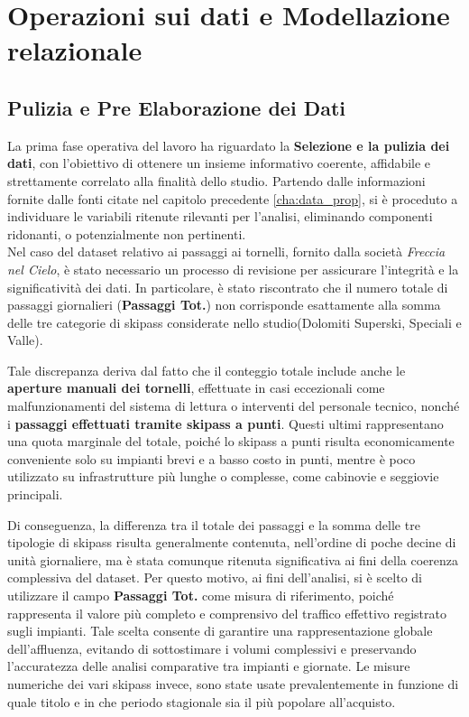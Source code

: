 \chapter{Operazioni sui dati e Modellazione relazionale}
\label{cha:Data_op}

\section{Pulizia e Pre Elaborazione dei Dati} \label{par:Pulizia_dati}

La prima fase operativa del lavoro ha riguardato la \textbf{Selezione e la pulizia dei dati}, con l'obiettivo di ottenere un insieme informativo coerente, affidabile e strettamente correlato alla finalità dello studio.
Partendo dalle informazioni fornite dalle fonti citate nel capitolo precedente \ref{cha:data_prop}, si è proceduto a individuare le variabili ritenute rilevanti per l'analisi, eliminando componenti ridonanti, o potenzialmente non pertinenti. \\

Nel caso del dataset relativo ai passaggi ai tornelli, fornito dalla società \textit{Freccia nel Cielo}, è stato necessario un processo di revisione per assicurare l'integrità e la significatività dei dati. In particolare, è stato riscontrato che il numero totale di passaggi giornalieri (\textbf{Passaggi Tot.}) non corrisponde esattamente alla somma delle tre categorie di skipass  considerate nello studio(Dolomiti Superski, Speciali e Valle).

Tale discrepanza deriva dal fatto che il conteggio totale include anche le \textbf{aperture manuali dei tornelli}, effettuate in casi eccezionali come malfunzionamenti del sistema di lettura o interventi del personale tecnico, nonché i \textbf{passaggi effettuati tramite skipass a punti}.
Questi ultimi rappresentano una quota marginale del totale, poiché lo skipass a punti risulta economicamente conveniente solo su impianti brevi e a basso costo in punti, mentre è poco utilizzato su infrastrutture più lunghe o complesse, come cabinovie e seggiovie principali.

Di conseguenza, la differenza tra il totale dei passaggi e la somma delle tre tipologie di skipass risulta generalmente contenuta, nell’ordine di poche decine di unità giornaliere,  ma è stata comunque ritenuta significativa ai fini della coerenza complessiva del dataset.
Per questo motivo, ai fini dell’analisi, si è scelto di utilizzare il campo \textbf{Passaggi Tot.} come misura di riferimento, poiché rappresenta il valore più completo e comprensivo del traffico effettivo registrato sugli impianti.
Tale scelta consente di garantire una rappresentazione globale dell’affluenza, evitando di sottostimare i volumi complessivi e preservando l’accuratezza delle analisi comparative tra impianti e giornate.
Le misure numeriche dei vari skipass invece, sono state usate prevalentemente in funzione di quale titolo e in che periodo stagionale sia il più popolare all'acquisto. \\


